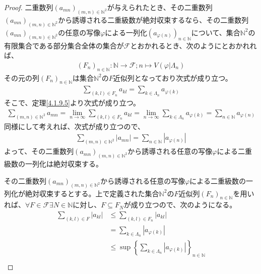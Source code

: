 \documentclass[dvipdfmx]{jsarticle}
\begin{document}
\begin{proof}
二重数列$\left( a_{mn} \right)_{(m,n) \in \mathbb{N}^{2}}$が与えられたとき、その二重数列$\left( a_{mn} \right)_{(m,n) \in \mathbb{N}^{2}}$から誘導される二重級数が絶対収束するなら、その二重数列$\left( a_{mn} \right)_{(m,n) \in \mathbb{N}^{2}}$の任意の写像$\varphi$による一列化$\left( a_{\varphi(n)} \right)_{n \in \mathbb{N}}$について、集合$\mathbb{N}^{2}$の有限集合である部分集合全体の集合が$\mathcal{F}$とおかれるとき、次のようにとおかれれば、
\begin{align*}
\left( F_{n} \right)_{n \in \mathbb{N}}:\mathbb{N}\mathcal{\rightarrow F;}n \mapsto V\left( \varphi|\varLambda_{n} \right)
\end{align*}
その元の列$\left( F_{n} \right)_{n \in \mathbb{N}}$は集合$\mathbb{N}^{2}$の$F$近似列となっており次式が成り立つ。
\begin{align*}
\sum_{(k,l) \in F_{n}}a_{kl} = \sum_{k \in \varLambda_{n}}a_{\varphi(k)}
\end{align*}
そこで、定理\ref{4.1.9.5}より次式が成り立つ。
\begin{align*}
\sum_{(m,n) \in \mathbb{N}^{2}}a_{mn} = \lim_{n \rightarrow \infty}{\sum_{(k,l) \in F_{n}}a_{kl}} = \lim_{n \rightarrow \infty}{\sum_{k \in \varLambda_{n}}a_{\varphi(k)}} = \sum_{n \in \mathbb{N}}a_{\varphi(n)}
\end{align*}
同様にして考えれば、次式が成り立つので、
\begin{align*}
\sum_{(m,n) \in \mathbb{N}^{2}}\left| a_{mn} \right| = \sum_{n \in \mathbb{N}}\left| a_{\varphi(n)} \right|
\end{align*}
よって、その二重数列$\left( a_{mn} \right)_{(m,n) \in \mathbb{N}^{2}}$から誘導される任意の写像$\varphi$による二重級数の一列化は絶対収束する。\par
その二重数列$\left( a_{mn} \right)_{(m,n) \in \mathbb{N}^{2}}$から誘導される任意の写像$\varphi$による二重級数の一列化が絶対収束するとする。上で定義された集合$\mathbb{N}^{2}$の$F$近似列$\left( F_{n} \right)_{n \in \mathbb{N}}$を用いれば、$\forall F \in \mathcal{F\exists}N \in \mathbb{N}$に対し、$F \subseteq F_{N}$が成り立つので、次のようになる。
\begin{align*}
\sum_{(k,l) \in F}\left| a_{kl} \right| &\leq \sum_{(k,l) \in F_{n}}\left| a_{kl} \right|\\
&= \sum_{k \in \varLambda_{n}}\left| a_{\varphi(k)} \right|\\
&\leq \sup\left\{ \sum_{k \in \varLambda_{n}}\left| a_{\varphi(k)} \right| \right\}_{n \in \mathbb{N}}\\

\end{align*}
\end{proof}
\end{document}
